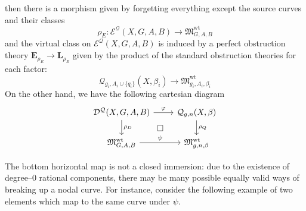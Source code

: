 \documentclass[11pt]{amsart}
\newcommand{\Q}[4]{\mathcal{Q}_{#1,#2}(#3,#4)}
\newcommand{\D}[3]{\mathcal{D^Q}(#1,#2,#3)}
\newcommand{\E}[3]{\mathcal{E^Q}(#1,#2,#3)}
\renewcommand{\to}{\rightarrow}
\newcommand{\EE}{\mathbf{E}}
\newcommand{\LL}{\mathbf{L}}
\newcommand{\MM}{\mathfrak M}
\theoremstyle{definition}
\theoremstyle{definition}
\begin{document}
then there is a morphism given by forgetting everything except the source curves and their classes
\begin{equation*} \rho_E : \E{X}{G,A}{B} \to \MM_{G,A,B}^{\operatorname{wt}} \end{equation*}
and the virtual class on $\E{X}{G,A}{B}$ is induced by a perfect obstruction theory $\EE_{\rho_E} \to \LL_{\rho_E}$ given by the product of the standard obstruction theories for each factor:
\begin{equation*} \Q{g_i}{A_i\cup\{q_i\}}{X}{\beta_i}\to \MM_{g_i,A_i,\beta_i}^{\operatorname{wt}} \end{equation*}
On the other hand, we have the following cartesian diagram
\begin{equation} \label{Full quasimap diagram}
\begin{tikzcd}
\D{X}{G,A}{B} \ar[r,"\varphi"] \ar[d,"\rho_D"] \ar[rd,phantom,"\square"] & \Q{g}{n}{X}{\beta} \ar[d,"\rho_Q"] \\
\MM_{G,A,B}^{\operatorname{wt}} \ar[r,"\psi"] & \MM_{g,n,\beta}^{\operatorname{wt}}
\end{tikzcd}
\end{equation}

The bottom horizontal map is not a closed immersion: due to the existence of degree--$0$ rational components, there may be many possible equally valid ways of breaking up a nodal curve. For instance, consider the following example of two elements which map to the same curve under $\psi$.
\end{document}
